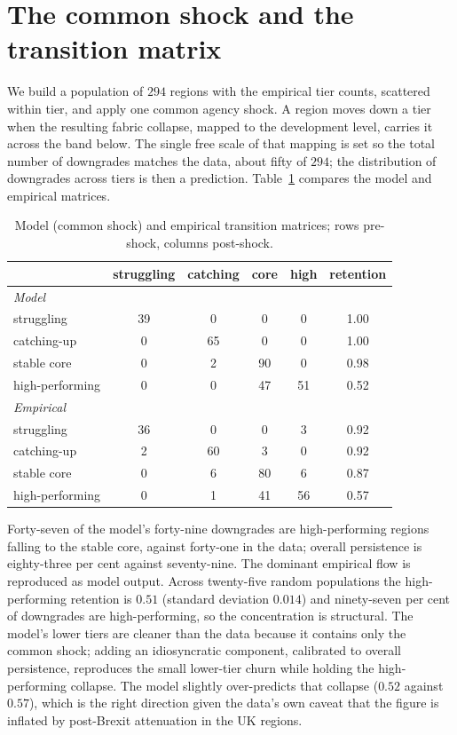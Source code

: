 \documentclass[11pt]{article}
\begin{document}
\section{The common shock and the transition matrix}

We build a population of $294$ regions with the empirical tier counts,
scattered within tier, and apply one common agency shock. A region moves
down a tier when the resulting fabric collapse, mapped to the development
level, carries it across the band below. The single free scale of that
mapping is set so the total number of downgrades matches the data, about
fifty of $294$; the distribution of downgrades across tiers is then a
prediction. Table~\ref{tab:trans} compares the model and empirical
matrices.

\begin{table}[t]
\centering
\caption{Model (common shock) and empirical transition matrices; rows
pre-shock, columns post-shock.}
\label{tab:trans}
\begin{tabular}{lcccc|c}
\toprule
& struggling & catching & core & high & retention \\
\midrule
\multicolumn{6}{l}{\textit{Model}}\\
struggling      & 39 & 0  & 0  & 0  & 1.00 \\
catching-up     & 0  & 65 & 0  & 0  & 1.00 \\
stable core     & 0  & 2  & 90 & 0  & 0.98 \\
high-performing & 0  & 0  & 47 & 51 & 0.52 \\
\midrule
\multicolumn{6}{l}{\textit{Empirical}}\\
struggling      & 36 & 0  & 0  & 3  & 0.92 \\
catching-up     & 2  & 60 & 3  & 0  & 0.92 \\
stable core     & 0  & 6  & 80 & 6  & 0.87 \\
high-performing & 0  & 1  & 41 & 56 & 0.57 \\
\bottomrule
\end{tabular}
\end{table}

Forty-seven of the model's forty-nine downgrades are high-performing
regions falling to the stable core, against forty-one in the data; overall
persistence is eighty-three per cent against seventy-nine. The dominant
empirical flow is reproduced as model output. Across twenty-five random
populations the high-performing retention is $0.51$ (standard deviation
$0.014$) and ninety-seven per cent of downgrades are high-performing, so the
concentration is structural. The model's lower tiers are cleaner than the
data because it contains only the common shock; adding an idiosyncratic
component, calibrated to overall persistence, reproduces the small
lower-tier churn while holding the high-performing collapse. The model
slightly over-predicts that collapse ($0.52$ against $0.57$), which is the
right direction given the data's own caveat that the figure is inflated by
post-Brexit attenuation in the UK regions.
\end{document}
